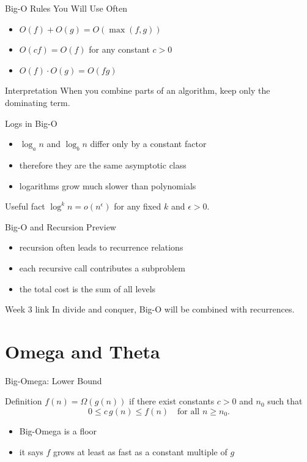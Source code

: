 \documentclass[aspectratio=169,xcolor=dvipsnames]{beamer}
\begin{document}
\begin{frame}{Big-O Rules You Will Use Often}
  \begin{itemize}
    \item $O(f) + O(g) = O(\max(f,g))$
    \item $O(cf) = O(f)$ for any constant $c > 0$
    \item $O(f) \cdot O(g) = O(fg)$
  \end{itemize}
  \begin{exampleblock}{Interpretation}
    When you combine parts of an algorithm, keep only the dominating term.
  \end{exampleblock}
\end{frame}

\begin{frame}{Logs in Big-O}
  \begin{itemize}
    \item $\log_a n$ and $\log_b n$ differ only by a constant factor
    \item therefore they are the same asymptotic class
    \item logarithms grow much slower than polynomials
  \end{itemize}
  \begin{block}{Useful fact}
    $\log^k n = o(n^\epsilon)$ for any fixed $k$ and $\epsilon > 0$.
  \end{block}
\end{frame}

\begin{frame}{Big-O and Recursion Preview}
  \begin{itemize}
    \item recursion often leads to recurrence relations
    \item each recursive call contributes a subproblem
    \item the total cost is the sum of all levels
  \end{itemize}
  \begin{block}{Week 3 link}
    In divide and conquer, Big-O will be combined with recurrences.
  \end{block}
\end{frame}

\section{Omega and Theta}
\begin{frame}{Big-Omega: Lower Bound}
  \begin{block}{Definition}
    $f(n) = \Omega(g(n))$ if there exist constants $c > 0$ and $n_0$ such that
    \[
      0 \le c\,g(n) \le f(n) \quad \text{for all } n \ge n_0.
    \]
  \end{block}
  \begin{itemize}
    \item Big-Omega is a floor
    \item it says $f$ grows at least as fast as a constant multiple of $g$
  \end{itemize}
\end{frame}
\end{document}

